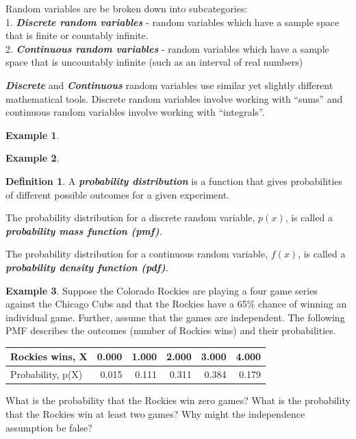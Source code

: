 \documentclass[
  11pt,
]{book}
\theoremstyle{definition}
\newtheorem{definition}{Definition}[chapter]
\theoremstyle{definition}
\newtheorem{example}{Example}[chapter]
\theoremstyle{definition}
\theoremstyle{definition}
\theoremstyle{remark}
\begin{document}
Random variables are be broken down into subcategories:\\
1. \textbf{\emph{Discrete random variables}} - random variables which have a sample space that is finite or countably infinite.\\
2. \textbf{\emph{Continuous random variables}} - random variables which have a sample space that is uncountably infinite (such as an interval of real numbers)

\textbf{\emph{Discrete}} and \textbf{\emph{Continuous}} random variables use similar yet slightly different mathematical tools. Discrete random variables involve working with ``sums'' and continuous random variables involve working with ``integrals''.

\begin{example}
\[ \]
\end{example}

\hfill\break
\hfill\break
\hfill\break

\begin{example}
\[ \]
\end{example}

\hfill\break
\hfill\break
\hfill\break

\begin{definition}
A \textbf{\emph{probability distribution}} is a function that gives probabilities of different possible outcomes for a given experiment.
\end{definition}

The probability distribution for a discrete random variable, \(p(x)\), is called a \textbf{\emph{probability mass function (pmf)}}.

The probability distribution for a continuous random variable, \(f(x)\), is called a \textbf{\emph{probability density function (pdf)}}.

\begin{example}
Suppose the Colorado Rockies are playing a four game series against the Chicago Cubs and that the Rockies have a 65\% chance of winning an individual game. Further, assume that the games are independent. The following PMF describes the outcomes (number of Rockies wins) and their probabilities.

\begin{table}
\centering
\begin{tabular}{l|r|r|r|r|r}
\hline
Rockies wins, X & 0.000 & 1.000 & 2.000 & 3.000 & 4.000\\
\hline
Probability, p(X) & 0.015 & 0.111 & 0.311 & 0.384 & 0.179\\
\hline
\end{tabular}
\end{table}

What is the probability that the Rockies win zero games? What is the probability that the Rockies win at least two games? Why might the independence assumption be false?
\end{example}
\end{document}

